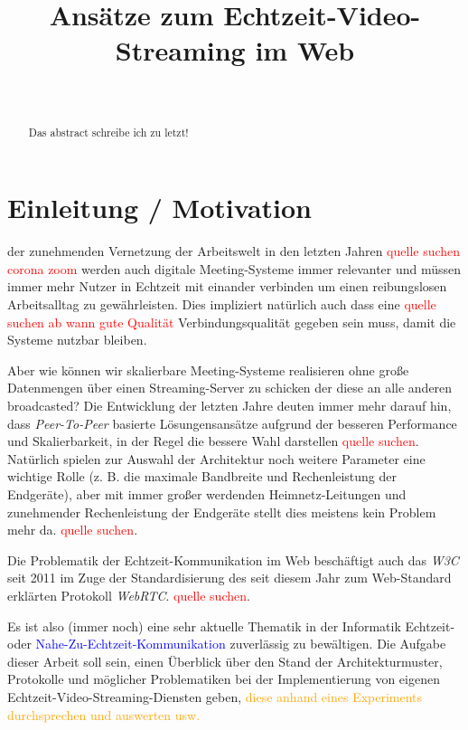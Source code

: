 \documentclass[journal]{IEEEtran}
\title{Ansätze zum Echtzeit-Video-Streaming im Web}
\author{
	\IEEEauthorblockN{Maximilian Schulke \textit{(Matrikel-Nr. 20215853)}}\\
	\IEEEauthorblockA{
		Technische Hochschule Brandenburg \\
		B.Sc. Medieninformatik \\
		Computergrafik
	}
}
\begin{document}

\maketitle

\begin{abstract}
	\lipsum[1-2][2-3]
	\lipsum[1-2][2-3]
	Das abstract schreibe ich zu letzt!
\end{abstract}

\tableofcontents

\section{Einleitung / Motivation}
 der zunehmenden Vernetzung der Arbeitswelt
in den letzten Jahren \textcolor{red}{quelle suchen corona zoom} werden auch
digitale Meeting-Systeme immer relevanter und müssen immer mehr Nutzer in
Echtzeit mit einander verbinden um einen reibungslosen Arbeitsalltag zu
gewährleisten. Dies impliziert natürlich auch dass eine \textcolor{red}{quelle
suchen ab wann gute Qualität} Verbindungsqualität gegeben sein muss, damit die
Systeme nutzbar bleiben.

Aber wie können wir skalierbare Meeting-Systeme realisieren ohne große
Datenmengen über einen Streaming-Server zu schicken der diese an alle anderen
broadcasted? Die Entwicklung der letzten Jahre deuten immer mehr darauf hin,
dass \textit{Peer-To-Peer} basierte Lösungensansätze aufgrund der besseren
Performance und Skalierbarkeit, in der Regel die bessere Wahl darstellen
\textcolor{red}{quelle suchen}. Natürlich spielen zur Auswahl der Architektur
noch weitere Parameter eine wichtige Rolle (z. B. die maximale Bandbreite und
Rechenleistung der Endgeräte), aber mit immer großer werdenden
Heimnetz-Leitungen und zunehmender Rechenleistung der Endgeräte stellt dies
meistens kein Problem mehr da. \textcolor{red}{quelle suchen}.

Die Problematik der Echtzeit-Kommunikation im Web beschäftigt auch
das \textit{W3C} seit 2011 im Zuge der Standardisierung des seit diesem Jahr
zum Web-Standard erklärten Protokoll \textit{WebRTC}. \textcolor{red}{quelle
suchen}.

Es ist also (immer noch) eine sehr aktuelle Thematik in der Informatik
Echtzeit- oder \textcolor{blue}{Nahe-Zu-Echtzeit-Kommunikation} zuverlässig zu
bewältigen. Die Aufgabe dieser Arbeit soll sein, einen Überblick über den
Stand der Architekturmuster, Protokolle und möglicher Problematiken bei der
Implementierung von eigenen Echtzeit-Video-Streaming-Diensten geben,
\textcolor{orange}{diese anhand eines Experiments durchsprechen und auswerten
usw.}
\end{document}
